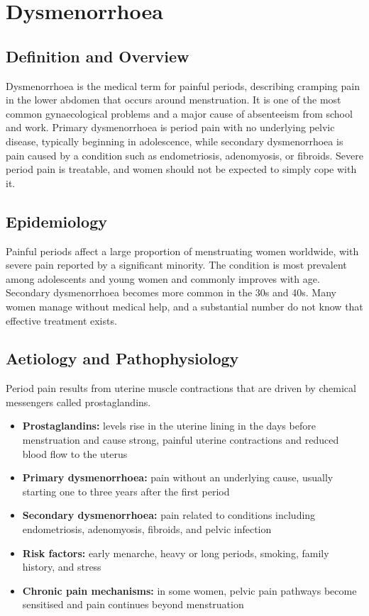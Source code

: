 \chapter{Dysmenorrhoea}

\section*{Definition and Overview}
Dysmenorrhoea is the medical term for painful periods, describing cramping pain in the lower abdomen that occurs around menstruation. It is one of the most common gynaecological problems and a major cause of absenteeism from school and work. Primary dysmenorrhoea is period pain with no underlying pelvic disease, typically beginning in adolescence, while secondary dysmenorrhoea is pain caused by a condition such as endometriosis, adenomyosis, or fibroids. Severe period pain is treatable, and women should not be expected to simply cope with it.

\section*{Epidemiology}
Painful periods affect a large proportion of menstruating women worldwide, with severe pain reported by a significant minority. The condition is most prevalent among adolescents and young women and commonly improves with age. Secondary dysmenorrhoea becomes more common in the 30s and 40s. Many women manage without medical help, and a substantial number do not know that effective treatment exists.

\section*{Aetiology and Pathophysiology}
Period pain results from uterine muscle contractions that are driven by chemical messengers called prostaglandins.
\begin{itemize}
    \item \textbf{Prostaglandins:} levels rise in the uterine lining in the days before menstruation and cause strong, painful uterine contractions and reduced blood flow to the uterus
    \item \textbf{Primary dysmenorrhoea:} pain without an underlying cause, usually starting one to three years after the first period
    \item \textbf{Secondary dysmenorrhoea:} pain related to conditions including endometriosis, adenomyosis, fibroids, and pelvic infection
    \item \textbf{Risk factors:} early menarche, heavy or long periods, smoking, family history, and stress
    \item \textbf{Chronic pain mechanisms:} in some women, pelvic pain pathways become sensitised and pain continues beyond menstruation
\end{itemize}

